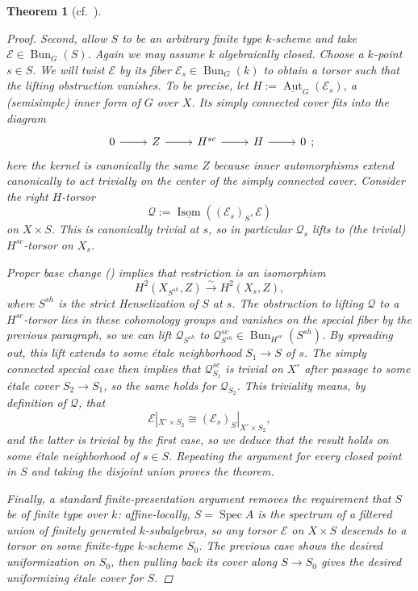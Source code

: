 \documentclass[openany]{amsbook}
\newtheorem{theorem}{Theorem}[chapter]
\theoremstyle{definition}
\theoremstyle{remark}
\numberwithin{equation}{section}
\newcommand{\cE}{\mathcal{E}}
\newcommand{\ul}[1]{\underline{#1}}
\renewcommand{\-}{\operatorname{-}}
\newcommand{\Spec}{\operatorname{Spec}}
\newcommand{\Aut}{\operatorname{Aut}}
\newcommand{\on}[1]{\operatorname{#1}}
\newcommand{\Bun}{\on{Bun}}
\begin{document}
\begin{theorem}[{cf.\ {\cite{HeinlothRelUnif}}}]
\begin{proof}
        Second, allow $S$ to be an arbitrary finite type $k$-scheme and take $\cE \in \Bun_G(S)$. Again we may assume $k$ algebraically closed. Choose a $k$-point $s \in S$. We will twist $\cE$ by its fiber $\cE_s \in \Bun_G(k)$ to obtain a torsor such that the lifting obstruction vanishes. To be precise, let $H := \ul{\Aut}_G(\cE_s)$, a (semisimple) inner form of $G$ over $X$. Its simply connected cover fits into the diagram
        \[
        \begin{tikzcd}
            0 \ar[r] & Z \ar[r] & H^{sc} \ar[r] & H \ar[r] & 0
        \end{tikzcd};
        \]
        here the kernel is canonically the same $Z$ because inner automorphisms extend canonically to act trivially on the center of the simply connected cover. Consider the right $H$-torsor 
        \[
            \mathcal{Q} := \ul{\on{Isom}}((\cE_s)_S, \cE)
        \]
        on $X \times S$. This is canonically trivial at $s$, so in particular $\mathcal{Q}_s$ lifts to (the trivial) $H^{sc}$-torsor on $X_s$. 
        
        Proper base change (\cite[Tag 095T]{stacks-project}) implies that restriction is an isomorphism
        $$
            H^2(X_{S^{sh}}, Z) \xrightarrow{\sim} H^2(X_s, Z),
        $$
        where $S^{sh}$ is the strict Henselization of $S$ at $s$. The obstruction to lifting $\mathcal{Q}$ to a $H^{sc}$-torsor lies in these cohomology groups and vanishes on the special fiber by the previous paragraph, so we can lift $\mathcal{Q}_{S^{sh}}$ to $\mathcal{Q}^{sc}_{S^{sh}} \in \Bun_{H^{sc}}(S^{sh})$. By spreading out, this lift extends to some \'etale neighborhood $S_1 \to S$ of $s$.  The simply connected special case then implies that $\mathcal{Q}^{sc}_{S_1}$ is trivial on $X^{\circ}$ after passage to some \'etale cover $S_2 \to S_1$, so the same holds for $\mathcal{Q}_{S_2}$. This triviality means, by definition of $\mathcal{Q}$, that
        $$
            \cE|_{X^\circ \times S_2} \cong (\cE_s)_S|_{X^{\circ} \times S_2},
        $$
        and the latter is trivial by the first case, so we deduce that the result holds on some \'etale neighborhood of $s \in S$. Repeating the argument for every closed point in $S$ and taking the disjoint union proves the theorem. 

        Finally, a standard finite-presentation argument removes the requirement that $S$ be of finite type over $k$: affine-locally, $S = \Spec A$ is the spectrum of a filtered union of finitely generated $k$-subalgebras, so any torsor $\cE$ on $X \times S$ descends to a torsor on some finite-type $k$-scheme $S_0$. The previous case shows the desired uniformization on $S_0$, then pulling back its cover along $S \to S_0$ gives the desired uniformizing \'etale cover for $S$.
    \end{proof}
\end{theorem}
\end{document}
